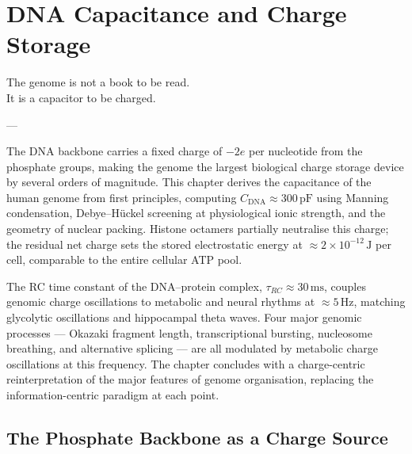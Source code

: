 
\chapter{DNA Capacitance and Charge Storage}
\label{chap:dna_capacitance}

\epigraph{%
  The genome is not a book to be read.\\
  It is a capacitor to be charged.%
}{---}

\begin{chapterbox}
The DNA backbone carries a fixed charge of $-2e$ per nucleotide from the
phosphate groups, making the genome the largest biological charge storage
device by several orders of magnitude. This chapter derives the capacitance
of the human genome from first principles, computing $C_{\mathrm{DNA}}
\approx 300\,\mathrm{pF}$ using Manning condensation, Debye--H\"uckel
screening at physiological ionic strength, and the geometry of nuclear
packing. Histone octamers partially neutralise this charge; the residual
net charge sets the stored electrostatic energy at $\approx 2\times 10^{-12}\,\mathrm{J}$
per cell, comparable to the entire cellular ATP pool.

The RC time constant of the DNA--protein complex, $\tau_{RC} \approx 30\,\mathrm{ms}$,
couples genomic charge oscillations to metabolic and neural rhythms at
$\approx 5\,\mathrm{Hz}$, matching glycolytic oscillations and hippocampal
theta waves. Four major genomic processes --- Okazaki fragment length,
transcriptional bursting, nucleosome breathing, and alternative splicing ---
are all modulated by metabolic charge oscillations at this frequency. The
chapter concludes with a charge-centric reinterpretation of the major
features of genome organisation, replacing the information-centric paradigm
at each point.
\end{chapterbox}

\section{The Phosphate Backbone as a Charge Source}
\label{sec:phosphate_charge}

